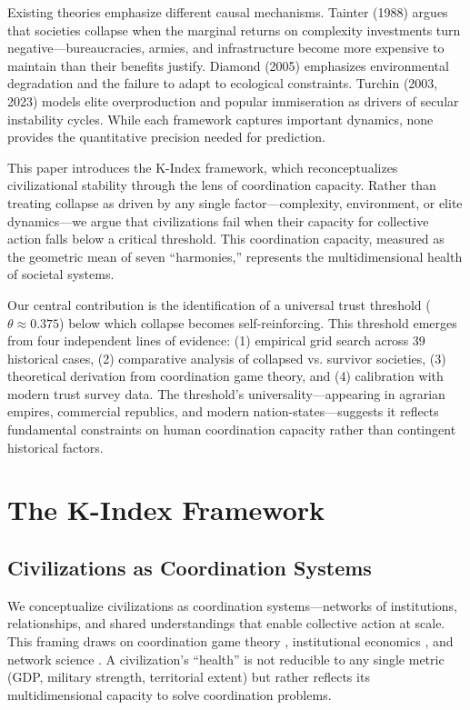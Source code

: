 \documentclass[11pt,a4paper]{article}
\begin{document}
Existing theories emphasize different causal mechanisms. Tainter (1988) argues that societies collapse when the marginal returns on complexity investments turn negative---bureaucracies, armies, and infrastructure become more expensive to maintain than their benefits justify. Diamond (2005) emphasizes environmental degradation and the failure to adapt to ecological constraints. Turchin (2003, 2023) models elite overproduction and popular immiseration as drivers of secular instability cycles. While each framework captures important dynamics, none provides the quantitative precision needed for prediction.

This paper introduces the K-Index framework, which reconceptualizes civilizational stability through the lens of coordination capacity. Rather than treating collapse as driven by any single factor---complexity, environment, or elite dynamics---we argue that civilizations fail when their capacity for collective action falls below a critical threshold. This coordination capacity, measured as the geometric mean of seven ``harmonies,'' represents the multidimensional health of societal systems.

Our central contribution is the identification of a universal trust threshold ($\theta \approx 0.375$) below which collapse becomes self-reinforcing. This threshold emerges from four independent lines of evidence: (1) empirical grid search across 39 historical cases, (2) comparative analysis of collapsed vs. survivor societies, (3) theoretical derivation from coordination game theory, and (4) calibration with modern trust survey data. The threshold's universality---appearing in agrarian empires, commercial republics, and modern nation-states---suggests it reflects fundamental constraints on human coordination capacity rather than contingent historical factors.

\section{The K-Index Framework}

\subsection{Civilizations as Coordination Systems}

We conceptualize civilizations as coordination systems---networks of institutions, relationships, and shared understandings that enable collective action at scale. This framing draws on coordination game theory \citep{schelling1960}, institutional economics \citep{north1990}, and network science \citep{barabasi2016}. A civilization's ``health'' is not reducible to any single metric (GDP, military strength, territorial extent) but rather reflects its multidimensional capacity to solve coordination problems.
\end{document}
